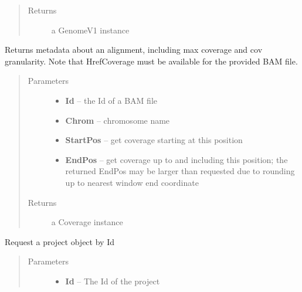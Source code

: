 \documentclass[letterpaper,10pt,english]{sphinxmanual}
\begin{document}
\begin{fulllineitems}
\begin{fulllineitems}
\begin{quote}
\begin{description}
\item[{Returns}] \leavevmode
a GenomeV1 instance

\end{description}\end{quote}

\end{fulllineitems}


\begin{fulllineitems}
\label{Available modules:BaseSpacePy.api.BaseSpaceAPI.BaseSpaceAPI.getIntervalCoverage}
Returns metadata about an alignment, including max coverage and cov granularity.
Note that HrefCoverage must be available for the provided BAM file.
\begin{quote}\begin{description}
\item[{Parameters}] \leavevmode\begin{itemize}
\item {} 
\textbf{Id} -- the Id of a BAM file

\item {} 
\textbf{Chrom} -- chromosome name

\item {} 
\textbf{StartPos} -- get coverage starting at this position

\item {} 
\textbf{EndPos} -- get coverage up to and including this position; the returned EndPos may be larger than requested due to rounding up to nearest window end coordinate

\end{itemize}

\item[{Returns}] \leavevmode
a Coverage instance

\end{description}\end{quote}

\end{fulllineitems}


\begin{fulllineitems}
\label{Available modules:BaseSpacePy.api.BaseSpaceAPI.BaseSpaceAPI.getProjectById}
Request a project object by Id
\begin{quote}\begin{description}
\item[{Parameters}] \leavevmode\begin{itemize}
\item {} 
\textbf{Id} -- The Id of the project


\end{itemize}
\end{description}
\end{quote}
\end{fulllineitems}
\end{fulllineitems}
\end{document}
